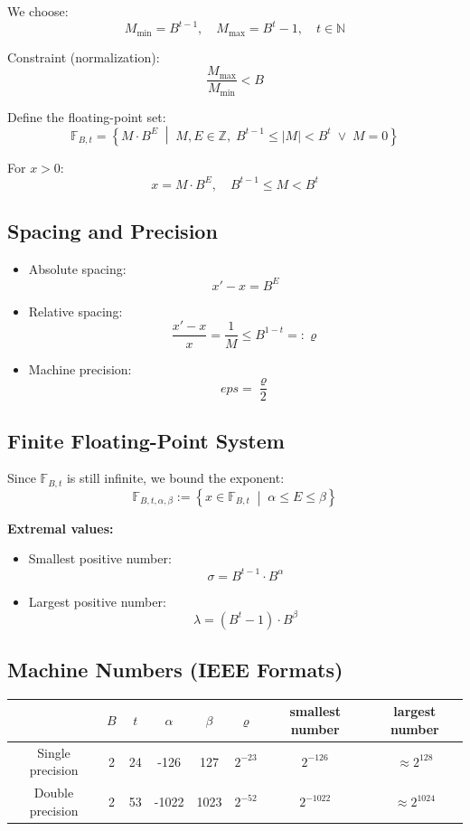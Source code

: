 \documentclass{article}
\begin{document}
We choose:
\[
M_{\min} = B^{t-1}, \quad M_{\max} = B^t - 1, \quad t \in \mathbb{N}
\]

Constraint (normalization):
\[
\frac{M_{\max}}{M_{\min}} < B
\]

Define the floating-point set:
\[
\mathbb{F}_{B,t} =
\left\{
  M \cdot B^E \;\middle|\;
  M,E \in \mathbb{Z},\;
  B^{t-1} \leq |M| < B^t \;\lor\; M = 0
\right\}
\]

For $x > 0$:
\[
x = M \cdot B^E, \quad B^{t-1} \leq M < B^t
\]

\subsection{Spacing and Precision}
\begin{itemize}
  \item Absolute spacing:
  \[
  x' - x = B^E
  \]
  \item Relative spacing:
  \[
  \frac{x' - x}{x} = \frac{1}{M} \leq B^{1-t} =: \varrho
  \]
  \item Machine precision:
  \[
  eps = \frac{\varrho}{2}
  \]
\end{itemize}

\subsection{Finite Floating-Point System}
Since $\mathbb{F}_{B,t}$ is still infinite, we bound the exponent:
\[
\mathbb{F}_{B,t,\alpha,\beta} :=
\left\{
  x \in \mathbb{F}_{B,t} \;\middle|\;
  \alpha \leq E \leq \beta
\right\}
\]

\textbf{Extremal values:}
\begin{itemize}
  \item Smallest positive number:
  \[
  \sigma = B^{t-1} \cdot B^\alpha
  \]
  \item Largest positive number:
  \[
  \lambda = (B^t - 1) \cdot B^\beta
  \]
\end{itemize}
\subsection{Machine Numbers (IEEE Formats)}

\begin{center}
\begin{tabular}{|c|c|c|c|c|c|c|c|}
  \hline
  & $B$ & $t$ & $\alpha$ & $\beta$ & $\varrho$ & smallest number & largest number \\
  \hline
  Single precision & 2 & 24 & -126 & 127 & $2^{-23}$ & $2^{-126}$ & $\approx 2^{128}$ \\
  \hline
  Double precision & 2 & 53 & -1022 & 1023 & $2^{-52}$ & $2^{-1022}$ & $\approx 2^{1024}$ \\
  \hline
\end{tabular}
\end{center}
\end{document}

